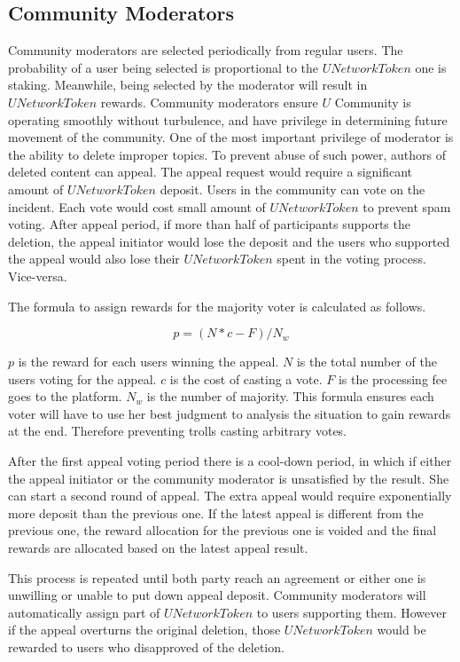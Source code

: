 \subsection{Community Moderators}
Community moderators are selected periodically from regular users. The probability of a user being selected is proportional to the $UNetworkToken$ one is staking. Meanwhile, being selected by the moderator will result in $UNetworkToken$ rewards.
Community moderators ensure $U$ Community is operating smoothly without turbulence, and have privilege in determining future movement of the community. One of the most important privilege of moderator is the ability to delete improper topics. To prevent abuse of such power, authors of  deleted content can appeal. The appeal request would require a significant amount of $UNetworkToken$ deposit. Users in the community can vote on the incident. Each vote would cost small amount of $UNetworkToken$ to prevent spam voting. After appeal period, if more than half of participants supports the deletion, the appeal initiator would lose the deposit and the users who supported the appeal would also lose their $UNetworkToken$ spent in the voting process. Vice-versa. \par
The formula to assign rewards for the majority voter is calculated as follows. 
\begin{center}
    $${p}=({N}*{c} - {F})/{N_w}$$
\end{center}
$p$ is the reward for each users winning the appeal. $N$ is the total number of the users voting for the appeal. $c$ is the cost of casting a vote. $F$ is the processing fee goes to the platform. $N_w$ is the number of majority. This formula ensures each voter will have to use her best judgment to analysis the situation to gain rewards at the end. Therefore preventing trolls casting arbitrary votes. \par
After the first appeal voting period there is a cool-down period, in which if either the appeal initiator or the community moderator is unsatisfied by the result. She can start a second round of appeal. The extra appeal would require exponentially more deposit than the previous one. If the latest appeal is different from the previous one, the reward allocation for the previous one is voided and the final rewards are allocated based on the latest appeal result. \par
This process is repeated until both party reach an agreement or either one is unwilling or unable to put down appeal deposit. 
Community moderators will automatically assign part of $UNetworkToken$ to users supporting them. However if the appeal overturns the original deletion, those $UNetworkToken$ would be rewarded to users who disapproved of the deletion.  
